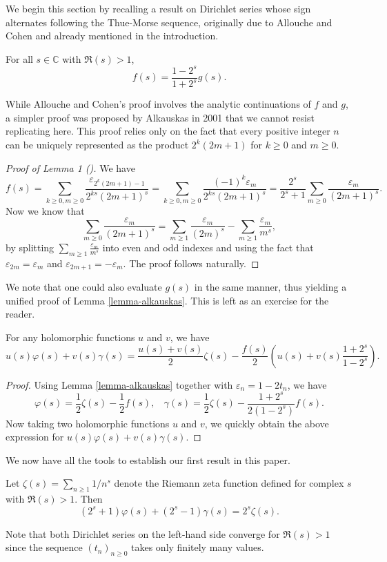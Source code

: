 \documentclass[12pt,reqno]{article}
\begin{document}
We begin this section by recalling a result on Dirichlet series whose sign alternates following the Thue-Morse sequence, originally due to Allouche and Cohen \cite{AlloucheCohen85} and already mentioned in the introduction.
\begin{lemma} \label{lemma-alkauskas}
	For all $s \in \mathbb{C}$ with $\Re(s)>1$,
	$$
	f(s) = \frac{1-2^s}{1+2^s} g(s).
	$$
\end{lemma}
While Allouche and Cohen's proof involves the analytic continuations of $f$ and $g$, a simpler proof was proposed by Alkauskas \cite{Alkauskas01} in 2001 that we cannot resist replicating here. This proof relies only on the fact that every positive integer $n$ can be uniquely represented as the product $2^k(2m+1)$ for $k\geq0$ and $m\geq0$.
\begin{proof} [Proof of Lemma 1 \rm (\cite{Alkauskas01})] 
	We have
	$$
	f(s) = \sum_{k\geq0,m\geq0} \frac{\varepsilon_{2^k(2m+1)-1}}{2^{ks}(2m+1)^s} = \sum_{k\geq0,m\geq0} \frac{(-1)^k\varepsilon_m}{2^{ks}(2m+1)^s} = \frac{2^s}{2^s+1} \sum_{m\geq0} \frac{\varepsilon_m}{(2m+1)^s}.
	$$
	Now we know that
	$$
	\sum_{m\geq0} \frac{\varepsilon_m}{(2m+1)^s} = \sum_{m\geq1} \frac{\varepsilon_m}{(2m)^s} - \sum_{m\geq1} \frac{\varepsilon_m}{m^s},
	$$
	by splitting $\sum_{m\geq1} \frac{\varepsilon_m}{m^s}$ into even and odd indexes and using the fact that $\varepsilon_{2m}=\varepsilon_m$ and $\varepsilon_{2m+1}=-\varepsilon_m$. The proof follows naturally.
\end{proof}
We note that one could also evaluate $g(s)$ in the same manner, thus yielding a unified proof of Lemma \ref{lemma-alkauskas}. This is left as an exercise for the reader.

\begin{corollary} \label{coro-holo}
	For any holomorphic functions $u$ and $v$, we have
	$$
	u(s)\varphi(s) + v(s)\gamma(s) = \frac{u(s) + v(s)}{2} \zeta(s) - \frac{f(s)}{2} \left(u(s)+v(s)\frac{1+2^s}{1-2^s}\right).
	$$
\end{corollary}
\begin{proof}
	Using Lemma \ref{lemma-alkauskas} together with $\varepsilon_n = 1 - 2t_n$, we have
	$$
	\varphi(s) = \frac12 \zeta(s) - \frac12 f(s), \ \ \ \ \gamma(s) = \frac12 \zeta(s) - \frac{1+2^s}{2(1-2^s)} f(s).
	$$
	Now taking two holomorphic functions $u$ and $v$, we quickly obtain the above expression for $u(s) \varphi(s) + v(s) \gamma(s)$.
\end{proof}

We now have all the tools to establish our first result in this paper.
\begin{theorem} \label{theo-riemann-zeta}
	Let $\zeta(s)=\sum_{n\geq1} 1/n^s$ denote the Riemann zeta function defined for complex $s$ with $\Re(s)>1$. Then
	$$
	(2^s+1) \varphi(s) + (2^s-1) \gamma(s) = 2^s \zeta(s).
	$$
\end{theorem}
Note that both Dirichlet series on the left-hand side converge for $\Re(s)>1$ since the sequence $(t_n)_{n\geq0}$ takes only finitely many values. 
\end{document}
